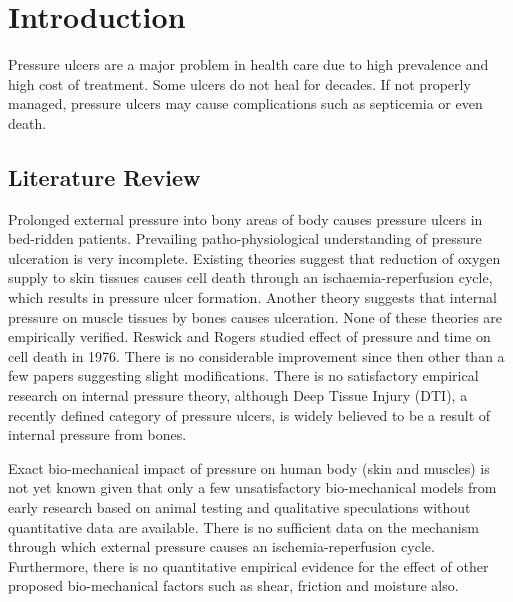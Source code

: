 \chapter{Introduction}

Pressure ulcers are a major problem in health care due to high prevalence and high cost of treatment. Some ulcers do not heal for decades. If not properly managed, pressure ulcers may cause complications such as septicemia or even death. 

\section{Literature Review}
Prolonged external pressure into bony areas of body causes pressure ulcers in bed-ridden patients. Prevailing patho-physiological understanding of pressure ulceration is very incomplete. Existing theories suggest that reduction of oxygen supply to skin tissues causes cell death through an ischaemia-reperfusion cycle, which results in pressure ulcer formation. Another theory suggests that internal pressure on muscle tissues by bones causes ulceration. None of these theories are empirically verified. Reswick and Rogers studied effect of pressure and time on cell death in 1976. There is no considerable improvement since then other than a few papers suggesting slight modifications. There is no satisfactory empirical research on internal pressure theory, although Deep Tissue Injury (DTI), a recently defined category of pressure ulcers, is widely believed to be a result of internal pressure from bones.

Exact bio-mechanical impact of pressure on human body (skin and muscles) is not yet known given that only a few unsatisfactory bio-mechanical models from early research based on animal testing and qualitative speculations without quantitative data are available. There is no sufficient data on the mechanism through which external pressure causes an ischemia-reperfusion cycle. Furthermore, there is no quantitative empirical evidence for the effect of other proposed bio-mechanical factors such as shear, friction and moisture also. 

